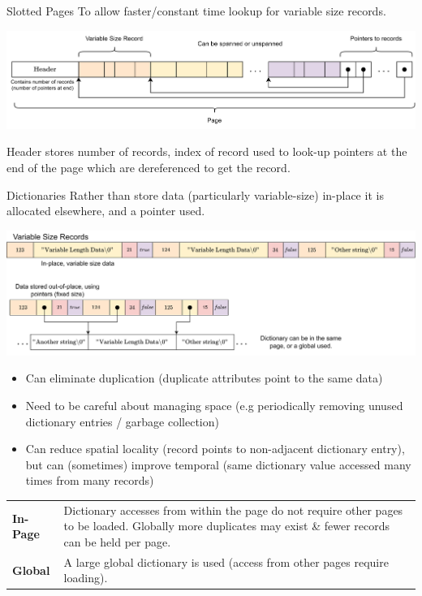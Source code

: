 \begin{definitionbox}{Slotted Pages}
    To allow faster/constant time lookup for variable size records.
    \begin{center}
        \includegraphics[width=\textwidth]{storage/images/slotted_pages.drawio.png}
    \end{center}
    Header stores number of records, index of record used to look-up pointers at the end of the page which are dereferenced to get the record.
\end{definitionbox}

\begin{definitionbox}{Dictionaries}
    Rather than store data (particularly variable-size) in-place it is allocated elsewhere, and a pointer used.
    \begin{center}
        \includegraphics[width=\textwidth]{storage/images/dictionary_layout.drawio.png}
    \end{center}
    \begin{itemize}
        \item Can eliminate duplication (duplicate attributes point to the same data)
        \item Need to be careful about managing space (e.g periodically removing unused dictionary entries / garbage collection)
        \item Can reduce spatial locality (record points to non-adjacent dictionary entry), but can (sometimes) improve temporal (same dictionary value accessed many times from many records)
    \end{itemize}
    \begin{center}
        \begin{tabular}{l p{}}
            \textbf{In-Page} & Dictionary accesses from within the page do not require other pages to be loaded. Globally more duplicates may exist \& fewer records can be held per page. \\
            \textbf{Global}  & A large global dictionary is used (access from other pages require loading).                                                                                \\
        \end{tabular}
    \end{center}
\end{definitionbox}
